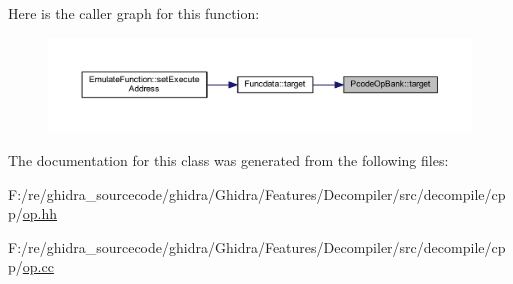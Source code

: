 Here is the caller graph for this function\+:
\nopagebreak
\begin{figure}[H]
\begin{center}
\leavevmode
\includegraphics[width=350pt]{class_pcode_op_bank_a12b06dc13326ce0291125b9dd11fadee_icgraph}
\end{center}
\end{figure}


The documentation for this class was generated from the following files\+:\begin{DoxyCompactItemize}
\item 
F\+:/re/ghidra\+\_\+sourcecode/ghidra/\+Ghidra/\+Features/\+Decompiler/src/decompile/cpp/\mbox{\hyperlink{op_8hh}{op.\+hh}}\item 
F\+:/re/ghidra\+\_\+sourcecode/ghidra/\+Ghidra/\+Features/\+Decompiler/src/decompile/cpp/\mbox{\hyperlink{op_8cc}{op.\+cc}}\end{DoxyCompactItemize}
